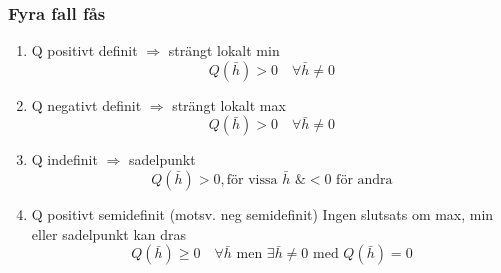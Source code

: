 \documentclass[a4paper]{article}
\begin{document}
\subsubsection{Fyra fall fås}
\begin{enumerate}
\item Q positivt definit $\Rightarrow$ strängt lokalt min
$$
	Q(\bar{h}) > 0 \quad\forall \bar{h} \neq 0
$$
\item Q negativt definit $\Rightarrow$ strängt lokalt max
$$
	Q(\bar{h}) > 0 \quad\forall \bar{h} \neq 0
$$
\item Q indefinit $\Rightarrow$ sadelpunkt
$$
	Q(\bar{h}) > 0 , \text{för vissa } \bar{h} \text{ \& } < 0 \text{ för andra}
$$
\item Q positivt semidefinit (motsv. neg semidefinit) 
Ingen slutsats om max, min eller sadelpunkt kan dras
$$
	Q(\bar{h}) \geq 0 \quad\forall \bar{h} \text{ men } \exists\bar{h} \neq 0 \text{ med } Q(\bar{h}) = 0
$$
\end{enumerate}

\newpage
\end{document}
